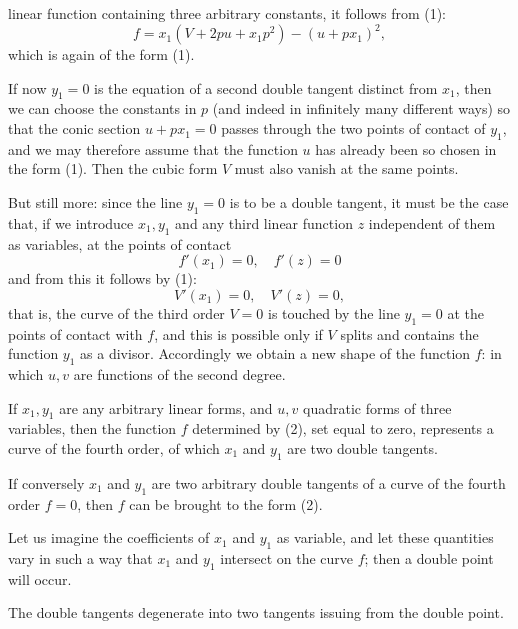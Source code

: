 linear function containing three arbitrary constants, it
follows from (1):
\[
f = x_1 (V + 2pu + x_1p^2) - (u + px_1)^2,
\]
which is again of the form (1).

If now $y_1 = 0$ is the equation of a second double tangent distinct from $x_1$, then we can choose the constants in $p$ (and indeed in infinitely many different ways) so that the conic section $u + px_1 = 0$ passes through the two points of contact of $y_1$, and we may therefore assume that the function $u$ has already been so chosen in the form (1). Then the cubic form $V$ must also vanish at the same points.

But still more: since the line $y_1 = 0$ is to be a double tangent, it must be the case that, if we introduce $x_1, y_1$ and any third linear function $z$ independent of them as variables, at the points of contact
\[
f'(x_1) = 0, \quad f'(z) = 0
\]
and from this it follows by (1):
\[
V'(x_1) = 0, \quad V'(z) = 0,
\]
that is, the curve of the third order $V = 0$ is touched by the line $y_1 = 0$ at the points of contact with $f$, and this is possible only if $V$ splits and contains the function $y_1$ as a divisor. Accordingly we obtain a new shape of the function $f$:
in which $u, v$ are functions of the second degree.

If $x_1, y_1$ are any arbitrary linear forms, and $u, v$ quadratic forms of three variables, then the function $f$ determined by (2), set equal to zero, represents a curve of the fourth order, of which $x_1$ and $y_1$ are two double tangents.

If conversely $x_1$ and $y_1$ are two arbitrary double tangents of a curve of the fourth order $f = 0$, then $f$ can be brought to the form (2).

Let us imagine the coefficients of $x_1$ and $y_1$ as variable, and let these quantities vary in such a way that $x_1$ and $y_1$ intersect on the curve $f$; then a double point will occur.

The double tangents degenerate into two tangents issuing from the double point.
